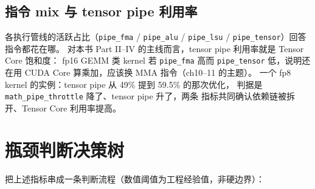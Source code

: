 \subsection{指令 mix 与 tensor pipe 利用率}

各执行管线的活跃占比（\texttt{pipe\_fma} / \texttt{pipe\_alu} /
\texttt{pipe\_lsu} / \texttt{pipe\_tensor}）回答指令都花在哪。
对本书 Part II--IV 的主线而言，tensor pipe 利用率就是 Tensor Core 饱和度：
fp16 GEMM 类 kernel 若 \texttt{pipe\_fma} 高而 \texttt{pipe\_tensor}
低，说明还在用 CUDA Core 算乘加，应该换 MMA 指令（ch10--11 的主题）。
一个 fp8 kernel 的实例：tensor pipe 从 49\% 提到 59.5\% 的那次优化，
判据是 \texttt{math\_\allowbreak{}pipe\_\allowbreak{}throttle} 降了、tensor pipe 升了，两条
指标共同确认依赖链被拆开、Tensor Core 利用率提高。

\section{瓶颈判断决策树}\label{sec:ch00-tree}

把上述指标串成一条判断流程（数值阈值为工程经验值，非硬边界）：

